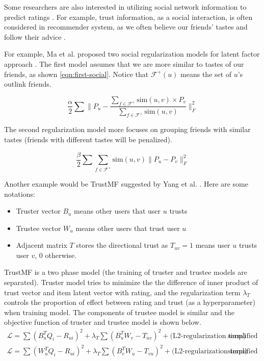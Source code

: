 \documentclass[letter paper, 11pt]{article}
\begin{document}
	Some researchers are also interested in utilizing social network information to predict ratings \cite{social-regularization} \cite{review}. For example, trust information, as a social interaction, is often considered in recommender system, as we often believe our friends' tastes and follow their advice \cite{social-regularization}.
	
	For example, Ma et al. proposed two social regularization models for latent factor approach \cite{social-regularization}. The first model assumes that we are more similar to tastes of our friends, as shown \ref{eqn:first-social}. Notice that $\mathcal{F}^+(u)$ means the set of $u$'s outlink friends.
	
	\begin{equation}
		\label{eqn:first-social}
		\tag*{First Regularization Model}
		\dfrac{\alpha}{2} \sum \|P_u - \dfrac{\sum_{f \in \mathcal{F}^+} \text{sim}(u, v) \times P_v }{\sum_{f \in \mathcal{F}^+} \text{sim}(u, v)} \|_F^2
	\end{equation} 
	
	The second regularization model more focuses on grouping friends with similar tastes (friends with different tastes will be penalized).

	\begin{equation}
		\label{eqn:sec-social}
		\tag*{Second Regularization Model}
		\dfrac{\beta}{2} \sum \sum_{f \in \mathcal{F}^+} \text{sim}(u, v) \|P_u - P_v\|_F^2
	\end{equation}
	
	Another example would be TrustMF suggested by Yang et al. \cite{TrustMF}. Here are some notations:
	\begin{itemize}
		\item Truster vector $B_u$ means other users that user $u$ trusts
		
		\item Trustee vector $W_u$ means other users that trust user $u$
		
		\item Adjacent matrix $T$ stores the directional trust as $T_{uv} = 1$ means user $u$ trusts user $v$, 0 otherwise.
	\end{itemize}
	
	TrustMF is a two phase model (the training of truster and trustee models are separated). Truster model tries to minimize the the difference of inner product of trust vector and item latent vector with rating, and the regularization term $\lambda_T$ controls the proportion of effect between rating and trust (as a hyperparameter) when training
	model. The components of trustee model is similar and the objective function of truster and trustee model is shown below.
	\begin{equation}
		\begin{split}
			\mathcal{L} = \sum (B_u^T Q_i - R_{ui})^2 + \lambda_T \sum (B_u^T W_v - T_{uv})^2 + \text{(L2-regularization term)} & \quad \text{simplified truster model} \\
			\mathcal{L} = \sum (W_u^T Q_i - R_{ui})^2 + \lambda_T \sum (B_v^T W_u - T_{vu})^2 + \text{(L2-regularization term)} & \quad \text{simplified trustee model} 
		\end{split}		
	\end{equation}
\end{document}
